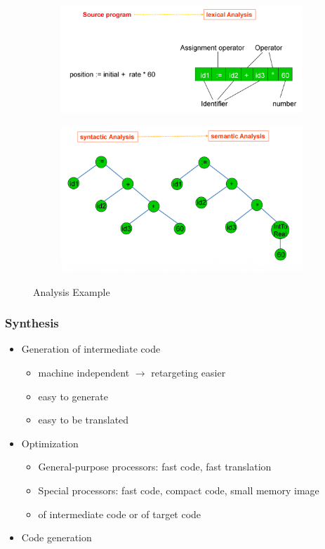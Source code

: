 \begin{figure}[h]
	\begin{center}
		\begin{subfigure}[b]{0.5\textwidth}
			\includegraphics[width=\textwidth]{images/Analysis_1.png}
		\end{subfigure}
		\hfill
		\begin{subfigure}[b]{0.4\textwidth}
			\includegraphics[width=\textwidth]{images/Analysis_2.png}			
		\end{subfigure}
		\caption{Analysis Example}
		\label{fig:analysis}
	\end{center}
\end{figure}

\subsubsection{Synthesis}
\begin{itemize}
	\item Generation of intermediate code
\begin{itemize}
	\item machine independent $\rightarrow$ retargeting easier
	\item easy to generate
	\item easy to be translated 
\end{itemize}
\item Optimization
\begin{itemize}
	\item General-purpose processors: fast code, fast translation
	\item Special processors: fast code, compact code, small memory image
	\item of intermediate code or of target code
\end{itemize}
\item Code generation
\end{itemize}

